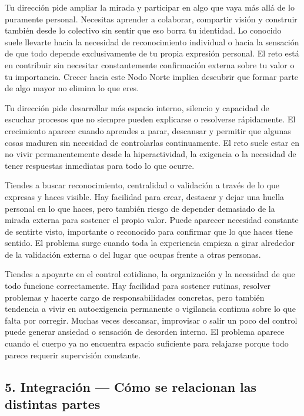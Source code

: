 \documentclass[11pt,a4paper]{article}
\begin{document}
Tu dirección pide ampliar la mirada y participar en algo que vaya más allá de lo puramente personal. Necesitas aprender a colaborar, compartir visión y construir también desde lo colectivo sin sentir que eso borra tu identidad. Lo conocido suele llevarte hacia la necesidad de reconocimiento individual o hacia la sensación de que todo depende exclusivamente de tu propia expresión personal. El reto está en contribuir sin necesitar constantemente confirmación externa sobre tu valor o tu importancia. Crecer hacia este Nodo Norte implica descubrir que formar parte de algo mayor no elimina lo que eres.

Tu dirección pide desarrollar más espacio interno, silencio y capacidad de escuchar procesos que no siempre pueden explicarse o resolverse rápidamente. El crecimiento aparece cuando aprendes a parar, descansar y permitir que algunas cosas maduren sin necesidad de controlarlas continuamente. El reto suele estar en no vivir permanentemente desde la hiperactividad, la exigencia o la necesidad de tener respuestas inmediatas para todo lo que ocurre.

Tiendes a buscar reconocimiento, centralidad o validación a través de lo que expresas y haces visible. Hay facilidad para crear, destacar y dejar una huella personal en lo que haces, pero también riesgo de depender demasiado de la mirada externa para sostener el propio valor. Puede aparecer necesidad constante de sentirte visto, importante o reconocido para confirmar que lo que haces tiene sentido. El problema surge cuando toda la experiencia empieza a girar alrededor de la validación externa o del lugar que ocupas frente a otras personas.

Tiendes a apoyarte en el control cotidiano, la organización y la necesidad de que todo funcione correctamente. Hay facilidad para sostener rutinas, resolver problemas y hacerte cargo de responsabilidades concretas, pero también tendencia a vivir en autoexigencia permanente o vigilancia continua sobre lo que falta por corregir. Muchas veces descansar, improvisar o salir un poco del control puede generar ansiedad o sensación de desorden interno. El problema aparece cuando el cuerpo ya no encuentra espacio suficiente para relajarse porque todo parece requerir supervisión constante.

\vspace{0.5cm}


\subsection{5. Integración — Cómo se relacionan las distintas partes}
\end{document}

